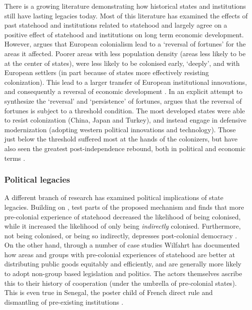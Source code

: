 \documentclass[12pt]{article}
\begin{document}
There is a growing literature demonstrating how historical states and
institutions still have lasting legacies today. Most of this literature has
examined the effects of past statehood \citep{Bockstette2002, Borcan2018} and
institutions related to statehood \citep{Michalopoulos2013, Michalopoulos2018,
Englebert2000} and largely agree on a positive effect of statehood and
institutions \citep{Nunn_2020, Michalopoulos2016} on long term economic
development. However, \citet{Acemoglu_2002} argues that European colonialism
lead to a `reversal  of fortunes' for the areas it affected. Poorer areas with
less population density (areas less likely to be at the center of states), were
less likely to be colonised early, `deeply', and with European settlers (in part
because of states more effectively resisting colonization). This lead to a
larger transfer of European institutional innovations, and consequently a
reversal of economic development \citep{Acemoglu_2002}. In an explicit attempt
to synthesize the `reversal' and `persistence' of fortunes, \citep{Foa_2017}
argues that the reversal of fortunes is subject to a threshold condition.
The most developed states were able to resist colonization (China, Japan and
Turkey), and instead engage in defensive modernization (adopting western
political innovations and technology). Those just below the threshold suffered
most at the hands of the colonizers, but have also seen the greatest
post-independence rebound, both in political and economic terms \citep{Foa_2017}.


\subsubsection{Political legacies} \label{Political legacies}

A different branch of research has examined political implications of state
legacies. Building on \citet{Acemoglu_2002} , \citet{Hariri2012} test parts of
the proposed mechanism and finds that more pre-colonial experience of statehood
decreased the likelihood of being colonised, while it increased the likelihood
of only being \textit{indirectly} colonised. Furthermore, not being colonised,
or being so indirectly, depresses post-colonial democracy \citep{Hariri2012}. On
the other hand, through a number of case studies Wilfahrt
\citeyear{Wilfahrt2018, Wilfahrt_2021} has documented how areas and groups with
pre-colonial experiences of statehood are better at distributing public goods
equitably and efficiently, and are generally more likely to adopt 
non-group based legislation and politics. The actors themselves ascribe this
to their history of cooperation (under the umbrella of pre-colonial states).
This is even true in Senegal, the poster child of French direct rule and
dismantling of pre-existing institutions \citep{Wilfahrt_2021}.
\end{document}
